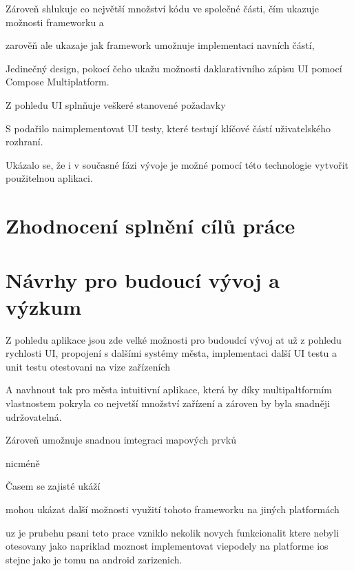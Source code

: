 Zároveň shlukuje co největší množství kódu ve společné části, čím ukazuje možnosti frameworku a 

zarověň ale ukazaje jak framework umožnuje implementaci navních částí, 

Jedinečný design, pokocí čeho ukažu možnosti daklarativního zápisu UI pomocí Compose Multiplatform.

Z pohledu UI splnňuje veškeré stanovené požadavky

S podařilo naimplementovat UI testy, které testují klíčové částí uživatelského rozhraní.

Ukázalo se, že i v současné fázi vývoje je možné pomocí této technologie vytvořit použitelnou aplikaci.

\section{Zhodnocení splnění cílů práce}
\section{Návrhy pro budoucí vývoj a výzkum}
Z pohledu aplikace jsou zde velké možnosti pro budoudcí vývoj 
at už z pohledu rychlosti UI, propojení s dalšími systémy města, implementaci další UI testu a unit testu
otestovani na vize zařízeních

A navhnout tak pro města intuitivní aplikace, která by díky multipaltformím vlastnostem pokryla co nejvetší množství zařízení
a zároven by byla snadněji udržovatelná.

Zároveň umožnuje snadnou imtegraci mapových prvků 

nicméně 


Časem se zajisté ukáží

\bigskip

mohou ukázat další možnosti využití tohoto frameworku na jiných platformách

uz je prubehu psani teto prace vzniklo nekolik novych funkcionalit ktere nebyli otesovany jako napriklad moznost
implementovat viepodely na platforme ios stejne jako je tomu na android zarizenich.

